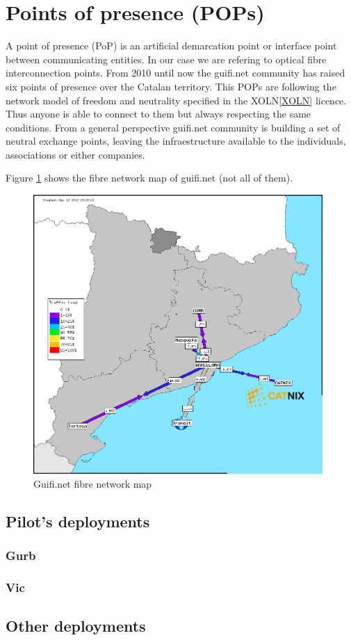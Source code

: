 \section{Points of presence (POPs)}

A point of presence (PoP) is an artificial demarcation point or interface point between communicating entities.
In our case we are refering to optical fibre interconnection points.
From 2010 until now the guifi.net community has raised six points of presence over the Catalan territory.
This POPs are following the network model of freedom and neutrality specified in the XOLN\ref{XOLN} licence.
Thus anyone is able to connect to them but always respecting the same conditions.
From a general perspective guifi.net community is building a set of neutral exchange points, leaving the
infraestructure available to the individuals, associations or either companies.

Figure \ref{fig:fibre_map} shows the fibre network map of guifi.net (not all of them).

\begin{figure}[htbp]
  \centering
  \includegraphics[width = 11cm]{sect3/figures/pops_network_map.png}
  \caption{Guifi.net fibre network map}
  \label{fig:fibre_map}
\end{figure}



\subsection{Pilot's deployments}

\subsubsection{Gurb}

\subsubsection{Vic}


\subsection{Other deployments}


